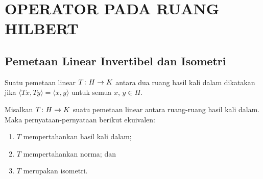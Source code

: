 \chapter{OPERATOR PADA RUANG HILBERT}

\section{Pemetaan Linear Invertibel dan Isometri}

\begin{defn} Suatu pemetaan linear $T\colon H \rightarrow K$ antara dua ruang hasil kali dalam dikatakan
 jika $\langle Tx, Ty \rangle = \langle x, y \rangle$ untuk semua $x$, $y \in H$.
\end{defn}

\begin{prop}\label{prop_isometry_equiv} Misalkan $T\colon H \rightarrow K$ suatu pemetaan linear antara ruang-ruang hasil kali dalam. Maka
pernyataan-pernyataan berikut ekuivalen:
 \begin{enumerate}[label=\rm{(\alph*)}]
   \item $T$ mempertahankan hasil kali dalam;
   \item $T$ mempertahankan norma; dan
   \item $T$ merupakan isometri.
 \end{enumerate}
\end{prop}

